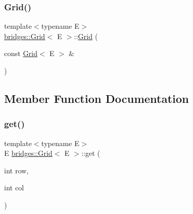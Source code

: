 \mbox{\label{classbridges_1_1_grid_af3b18d3a6b302c200154e869337cc85b}} 
\subsubsection{\texorpdfstring{Grid()}{Grid()}\hspace{0.1cm}{\footnotesize\ttfamily [4/4]}}
{\footnotesize\ttfamily template$<$typename E$>$ \\
\mbox{\hyperlink{classbridges_1_1_grid}{bridges\+::\+Grid}}$<$ E $>$\+::\mbox{\hyperlink{classbridges_1_1_grid}{Grid}} (\begin{DoxyParamCaption}\item[{const \mbox{\hyperlink{classbridges_1_1_grid}{Grid}}$<$ E $>$ \&}]{ }\end{DoxyParamCaption})\hspace{0.3cm}{\ttfamily [delete]}}



\subsection{Member Function Documentation}
\mbox{\label{classbridges_1_1_grid_aab69e77d9e1a51eabcf29c9c229cd35f}} 
\subsubsection{\texorpdfstring{get()}{get()}}
{\footnotesize\ttfamily template$<$typename E$>$ \\
E \mbox{\hyperlink{classbridges_1_1_grid}{bridges\+::\+Grid}}$<$ E $>$\+::get (\begin{DoxyParamCaption}\item[{int}]{row,  }\item[{int}]{col }\end{DoxyParamCaption})\hspace{0.3cm}{\ttfamily [inline]}}

\mbox{\label{classbridges_1_1_grid_ad21e4fc94483ef822fda9b74a52b9f48}} 
